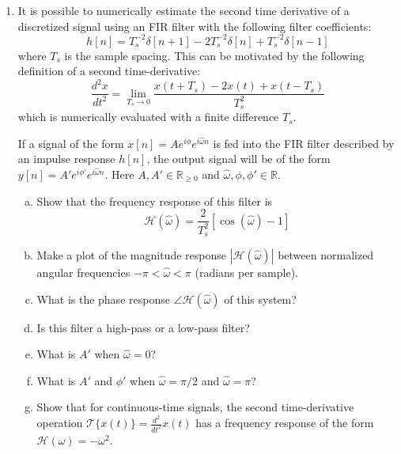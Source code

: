 \begin{enumerate}
\begin{marginfigure}
\begin{center}
\end{center}
\caption{The impulse response of a second order derivative estimator filter with $T_s=1$.}
\label{fig:exer_laplac}
\end{marginfigure}


\item It is possible to numerically estimate the second time
  derivative of a discretized signal using an FIR filter with the
  following filter coefficients:
  \begin{equation}h[n]= T_s^{-2}\delta[n+1] -2
    T_s^{-2}\delta[n] + T_s^{-2}\delta[n-1]
    \label{eq:fir_diff_filter}
    \end{equation}
  where $T_s$ is the sample spacing. This can be motivated by the following definition of a second time-derivative:
  \begin{equation}
    \frac{d^2x}{dt^2} = \lim_{T_s \rightarrow 0} \frac{x(t+T_s)-2x(t)+x(t-T_s)}{T_s^2}
  \end{equation}
  which is numerically evaluated with a finite difference $T_s$.

 If a signal of the form $x[n]=A e^{i\phi}e^{i\hat{\omega} n }$ is fed into the FIR filter described by an impulse response $h[n]$,
  the output signal will be of the form $y[n]=A' e^{i \phi'} e^{i \hat{\omega}n}$.
  Here $A,A'\in \mathbb{R}_{\ge 0}$ and $\hat{\omega},\phi,\phi' \in \mathbb{R}$.

  
  \begin{enumerate}[a)]
  \item Show that the frequency response of this filter is
    \begin{equation}
      \mathcal{H}(\hat{\omega}) = \frac{2}{T_s^{2}}[\cos(\hat{\omega})-1]
    \end{equation}
  \item Make a plot of the magnitude response $|\mathcal{H}(\hat{\omega})|$ between normalized angular frequencies $-\pi < \hat{\omega} < \pi$ (radians per sample).
  \item What is the phase response $\angle \mathcal{H}(\hat{\omega})$ of this system?
    
  \item Is this filter a high-pass or a low-pass filter? 
  \item What is $A'$ when $\hat{\omega}=0$?
  \item What is $A'$ and $\phi'$ when $\hat{\omega}=\pi/2$ and $\hat{\omega}=\pi$?
  \item Show that for continuous-time signals, the second
    time-derivative operation $\mathcal{T}\{x(t)\} =
    \frac{d^2}{dt^2}x(t)$ has a frequency response of the form
    $\mathcal{H}(\omega)=-\omega^2$.


\end{enumerate}
\end{enumerate}
